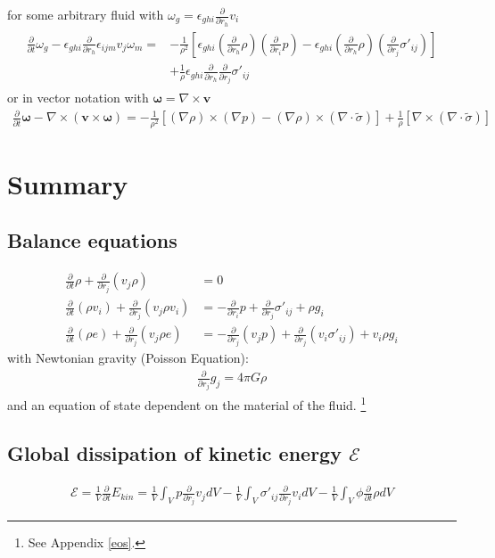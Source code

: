 \documentclass[a4paper,
					12pt,
					twoside,
					openright
					]{book}
\renewcommand{\vec}[1]{\boldsymbol{#1}}
\newcommand{\lra}[1]{{ \left( #1 \right) }}
\newcommand{\lrb}[1]{{ \left[ #1 \right] }}
\newcommand{\pd}[1]{\frac{\partial}{\partial #1}}
\begin{document}
for some arbitrary
fluid with $\omega_g=\epsilon_{ghi}\pd{r_h}v_i$
\begin{align}
\begin{split}
\pd{t}\omega_g
-\epsilon_{ghi}\pd{r_h} \epsilon_{ijm} v_j \omega_m =
&-\frac{1}{\rho^2}\lrb{
\epsilon_{ghi} \lra{\pd{r_h}\rho} \lra{\pd{r_i}p}
-\epsilon_{ghi} \lra{\pd{r_h}\rho} \lra{\pd{r_j}\sigma'_{ij}}}\\
&+\frac{1}{\rho}\epsilon_{ghi}\pd{r_h}\pd{r_j}\sigma'_{ij}
\end{split}
\end{align}
or in vector notation with $\vec{\omega}=\nabla \times \vec{v}$
\begin{align}
\pd{t} \vec{\omega}-\nabla \times (\vec{v} \times \vec{\omega}) = 
-\frac{1}{\rho^2}\lrb{(\nabla \rho) \times(\nabla p)
- (\nabla \rho) \times (\nabla \cdot \tilde{\sigma})}
+\frac{1}{\rho} \lrb{\nabla \times (\nabla \cdot \tilde{\sigma})}
\end{align}

\section{Summary}
\subsection*{Balance equations}
\begin{align}
\pd{t}\rho + \pd{r_j}(v_j \rho) &= 0 \label{eq:mass}\\
\pd{t}(\rho v_i) + \pd{r_j}(v_j \rho v_i) &= -\pd{r_i}p + \pd{r_j}\sigma'_{ij}
+\rho g_i 
\label{eq:mom} \\
\pd{t}(\rho e) + \pd{r_j}(v_j \rho e) &= -\pd{r_j}(v_j p) + \pd{r_j}(v_i
\sigma'_{ij}) + v_i \rho g_i
\label{eq:etot}
\end{align}
with Newtonian gravity (Poisson Equation):
\begin{align}
\pd{r_j}g_j=4\pi G \rho
\end{align}
and an equation of state dependent on the material of the fluid.
\footnote{See Appendix \ref{eos}.}

\subsection*{Global dissipation of kinetic energy $\mathcal{E}$}
\begin{align}
\mathcal{E} = \frac{1}{V} \pd{t} E_{kin} = 
\frac{1}{V} \int_V p \pd{r_j} v_j dV 
-\frac{1}{V} \int_V \sigma'_{ij}\pd{r_j} v_i dV
-\frac{1}{V} \int_V \phi \pd{t}\rho dV
\label{eq:diss}
\end{align}
\end{document}
